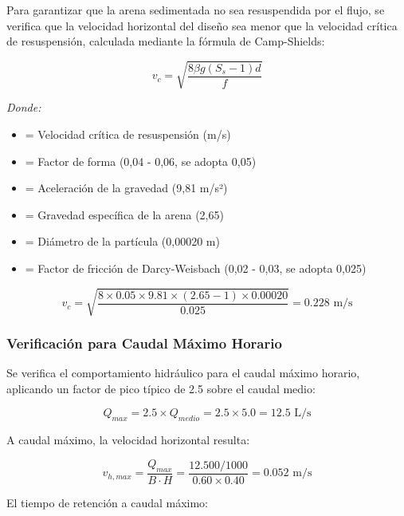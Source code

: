 \documentclass[12pt,a4paper]{article}
\begin{document}
Para garantizar que la arena sedimentada no sea resuspendida por el flujo, se verifica que la velocidad horizontal del diseño sea menor que la velocidad crítica de resuspensión, calculada mediante la fórmula de Camp-Shields:

\begin{equation}
v_c = \sqrt{\frac{8 \beta g (S_s - 1) d}{f}}
\end{equation}

\textit{Donde:}
\begin{itemize}[noitemsep,leftmargin=2em]
    \item[$v_c$] = Velocidad crítica de resuspensión (m/s)
    \item[$\beta$] = Factor de forma (0,04 - 0,06, se adopta 0,05)
    \item[$g$] = Aceleración de la gravedad (9,81 m/s²)
    \item[$S_s$] = Gravedad específica de la arena (2,65)
    \item[$d$] = Diámetro de la partícula (0,00020 m)
    \item[$f$] = Factor de fricción de Darcy-Weisbach (0,02 - 0,03, se adopta 0,025)
\end{itemize}

\begin{equation}
v_c = \sqrt{\frac{8 \times 0.05 \times 9.81 \times (2.65 - 1) \times 0.00020}{0.025}} = 0.228 \text{ m/s}
\end{equation}

\subsubsection{Verificación para Caudal Máximo Horario}

Se verifica el comportamiento hidráulico para el caudal máximo horario, aplicando un factor de pico típico de 2.5 sobre el caudal medio:

\begin{equation}
Q_{max} = 2.5 \times Q_{medio} = 2.5 \times 5.0 = 12.5 \text{ L/s}
\end{equation}

A caudal máximo, la velocidad horizontal resulta:

\begin{equation}
v_{h,max} = \frac{Q_{max}}{B \cdot H} = \frac{12.500/1000}{0.60 \times 0.40} = 0.052 \text{ m/s}
\end{equation}

El tiempo de retención a caudal máximo:
\end{document}
